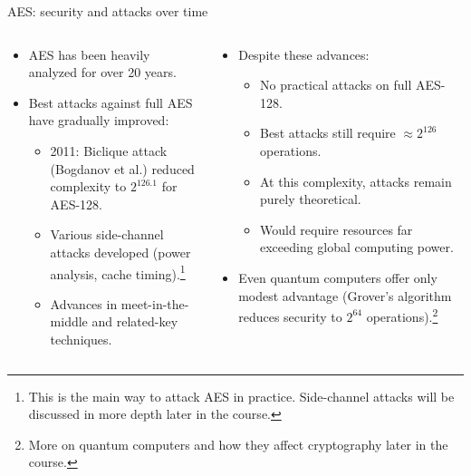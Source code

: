 \documentclass[aspectratio=169, lualatex, handout]{beamer}
\begin{document}
\begin{frame}{AES: security and attacks over time}
	\begin{columns}[c]
		\begin{column}{0.5\textwidth}
			\begin{itemize}
				\item AES has been heavily analyzed for over 20 years.
				\item Best attacks against full AES have gradually improved:
				      \begin{itemize}
					      \item 2011: Biclique attack (Bogdanov et al.) reduced complexity to $2^{126.1}$ for AES-128.
					      \item Various side-channel attacks developed (power analysis, cache timing).\footnote{This is the main way to attack AES in practice. Side-channel attacks will be discussed in more depth later in the course.}
					      \item Advances in meet-in-the-middle and related-key techniques.
				      \end{itemize}
			\end{itemize}
		\end{column}
		\begin{column}{0.5\textwidth}
			\begin{itemize}
				\item Despite these advances:
				      \begin{itemize}
					      \item No practical attacks on full AES-128.
					      \item Best attacks still require $\approx 2^{126}$ operations.
					      \item At this complexity, attacks remain purely theoretical.
					      \item Would require resources far exceeding global computing power.
				      \end{itemize}
				\item Even quantum computers offer only modest advantage (Grover's algorithm reduces security to $2^{64}$ operations).\footnote{More on quantum computers and how they affect cryptography later in the course.}
			\end{itemize}
		\end{column}
	\end{columns}
\end{frame}

\begin{frame}[plain]
	\titlepage
\end{frame}
\end{document}
